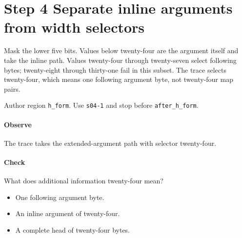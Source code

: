 \section{Step 4 Separate inline arguments from width selectors}\label{cbor-s04}
Mask the lower five bits. Values below twenty-four are the argument itself and take the inline path. Values twenty-four through twenty-seven select following bytes; twenty-eight through thirty-one fail in this subset. The trace selects twenty-four, which means one following argument byte, not twenty-four map pairs.

Author region \texttt{h\_form}. Use \texttt{s04-1} and stop before \texttt{after\_h\_form}.

\paragraph{Observe} The trace takes the extended-argument path with selector twenty-four.

\paragraph{Check} What does additional information twenty-four mean?
\begin{itemize}
  \item[A.] One following argument byte.
  \item[B.] An inline argument of twenty-four.
  \item[C.] A complete head of twenty-four bytes.
\end{itemize}
